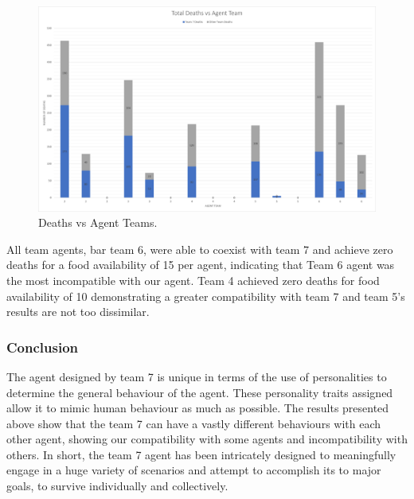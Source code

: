 \begin{figure}[H]
    \begin{center}
        \includegraphics[scale=0.4]{009_team_7_agent_design/Images/Chart.png}
    \end{center}
    \caption{Deaths vs Agent Teams.}
    \label{fig: agent deaths}
\end{figure}

All team agents, bar team 6, were able to coexist with team 7 and achieve zero deaths for a food availability of 15 per agent, indicating that Team 6 agent was the most incompatible with our agent. Team 4 achieved zero deaths for food availability of 10 demonstrating a greater compatibility with team 7 and team 5's results are not too dissimilar.  

\subsubsection{Conclusion}
The agent designed by team 7 is unique in terms of the use of personalities to determine the general behaviour of the agent. These personality traits assigned allow it to mimic human behaviour as much as possible. The results presented above show that the team 7 can have a vastly different behaviours with each other agent, showing our compatibility with some agents and incompatibility with others. In short, the team 7 agent has been intricately designed to meaningfully engage in a huge variety of scenarios and attempt to accomplish its to major goals, to survive individually and collectively.